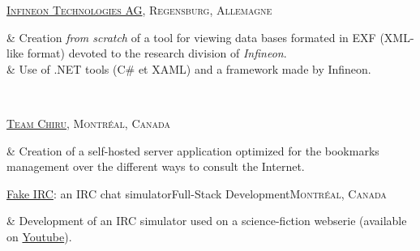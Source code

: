 	{\textsc{\href{https://www.infineon.com/}{Infineon Technologies AG}, Regensburg, Allemagne}}

\begin{cvstate}
	\begin{cvtable}{2.5ex}
		{\tiny {}} & Creation \textit{from scratch} of a tool for viewing data bases formated in EXF (XML-like format) devoted to the research division of \textit{Infineon}.\\
		{\tiny {}} & Use of .NET tools (C\# et XAML) and a framework made by Infineon.\\
	\end{cvtable}

	\\
\end{cvstate}


	{\textsc{\href{https://github.com/team-chiru}{Team Chiru}, Montréal, Canada}}

\begin{cvstate}
	\begin{cvtable}{2.5ex}
		{\tiny {}} & Creation of a self-hosted server application optimized for the bookmarks management over the different ways to consult the Internet.
	\end{cvtable}

\end{cvstate}

	{\href{https://github.com/team-chiru}{Fake IRC}: an IRC chat simulator}{Full-Stack Development}{}{}{\textsc{Montréal, Canada}}

\begin{cvstate}
	\begin{cvtable}{2.5ex}
		{\tiny {}} & Development of an IRC simulator used on a science-fiction webserie (available on \href{https://www.youtube.com/watch?v=U9DTxSYYKgM&list=PLlI9K5xHvuFVkLVb3ZxNV12b3j}{Youtube}).
	\end{cvtable}

\end{cvstate}
